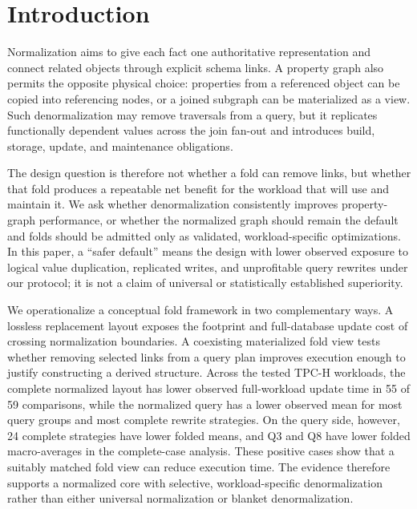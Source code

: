 \documentclass[sigconf]{acmart}
\begin{document}

\maketitle


\section{Introduction}

Normalization aims to give each fact one authoritative representation and
connect related objects through explicit schema links. A property graph also
permits the opposite physical choice: properties from a referenced object can
be copied into referencing nodes, or a joined subgraph can be materialized as
a view. Such denormalization may remove traversals from a query, but it replicates
functionally dependent values across the join fan-out and introduces build,
storage, update, and maintenance obligations.

The design question is therefore not whether a fold can remove links, but
whether that fold produces a repeatable net benefit for the workload that will
use and maintain it. We ask whether denormalization consistently improves
property-graph performance, or whether the normalized graph should remain the
default and folds should be admitted only as validated, workload-specific
optimizations. In this paper, a ``safer default'' means the design with lower
observed exposure to logical value duplication, replicated writes, and
unprofitable query rewrites under our protocol; it is not a claim of universal
or statistically established superiority.

We operationalize a conceptual fold framework in two complementary ways. A
lossless replacement layout exposes the footprint and full-database update
cost of crossing normalization boundaries. A coexisting materialized fold view
tests whether removing selected links from a query plan improves execution
enough to justify constructing a derived structure. Across the tested TPC-H
workloads, the complete normalized layout has lower observed full-workload
update time in 55 of 59 comparisons, while the
normalized query has a lower observed mean for most query groups and most
complete rewrite strategies.
On the query side, however, 24 complete strategies have lower folded means, and
Q3 and Q8 have lower folded macro-averages in the complete-case analysis. These
positive cases show that a suitably matched fold view can reduce execution
time. The evidence therefore supports a
normalized core with selective, workload-specific denormalization rather than
either universal normalization or blanket denormalization.
\end{document}
